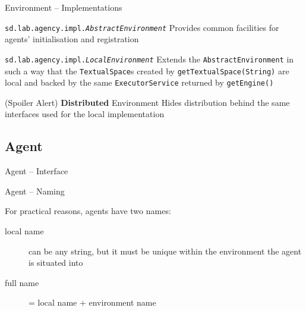 \documentclass[presentation]{beamer}\mode<presentation>{\usetheme{AMSCesenaPurpleAndGold}}
\begin{document}
\begin{frame}[allowframebreaks]{Environment -- Implementations}
    
    \begin{block}{\texttt{sd.lab.agency.impl.\textit{AbstractEnvironment}}}
        Provides common facilities for agents' initialisation and registration
    \end{block}
    
    \vfill
    
    \begin{exampleblock}{\texttt{sd.lab.agency.impl.\textit{LocalEnvironment}}}
        Extends the \texttt{AbstractEnvironment} in such a way that the \texttt{TextualSpace}s created by \texttt{getTextualSpace(String)} are \alert{local} and backed by the same \texttt{ExecutorService} returned by \texttt{getEngine()}
    \end{exampleblock}
    
    \vfill
    
    \begin{alertblock}{(Spoiler Alert) \textbf{Distributed} Environment}
        Hides distribution behind the same interfaces used for the local implementation
    \end{alertblock}
    
\end{frame}


\subsection{Agent}

\begin{frame}[allowframebreaks]{Agent -- Interface}
    
    
    
    
    
\end{frame}

\begin{frame}{Agent -- Naming}

For practical reasons, agents have two names:
%
\vfill
%
\begin{description}
    \item[local name] can be any string, but it must be \alert{unique} within the environment the agent is situated into
    
    \vfill
    
    \item[full name] = local name + environment name
    
\end{description}

\end{frame}
\end{document}
